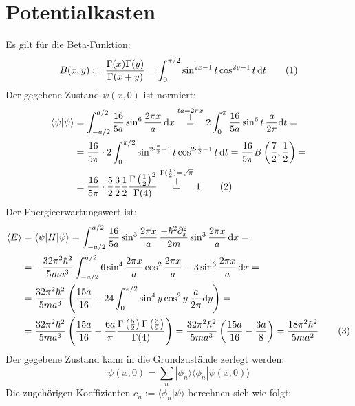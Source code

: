 \documentclass[a4paper,12pt]{article}
\newcommand\numberthis{\addtocounter{equation}{1}\tag{\theequation}}
\newcommand{\bra}{}
\newcommand{\kom}{}
\newcommand{\brak}{}
\newcommand{\braket}{}
\newcommand{\intx}{}
\newcommand{\kla}{}
\newcommand{\oper}{}
\begin{document}
\section{Potentialkasten}
Es gilt für die Beta-Funktion:
\begin{align*}
B(x,y):=\frac{\Gamma(x)\Gamma(y)}{\Gamma(x+y)}=\intx\int_{0}^{\pi/2}\sin^{2x-1}t\cos^{2y-1}t\,\mathrm{d}t \numberthis\label{Beta Funktion}
\end{align*}
Der gegebene Zustand $\psi(x,0)$ ist normiert:
\begin{align*}
\brak\langle {\psi}| {\psi}\rangle&=\intx\int_{-a/2}^{a/2}\frac{16}{5a}\sin^6\frac{2\pi x}{a}\,\mathrm{d}x\kom\overset{\substack{{ta=2\pi x} \\ |}}{=}2\intx\int_{0}^{\pi}\frac{16}{5a}\sin^6t\,\frac{a}{2\pi}\mathrm{d}t= \\
&=\frac{16}{5\pi}\cdot 2\intx\int_{0}^{\pi/2}\sin^{2\cdot\frac{7}{2}-1}t\cos^{2\cdot\frac{1}{2}-1}t\,\mathrm{d}t=\frac{16}{5\pi}B\left(\frac{7}{2},\frac{1}{2}\right)= \\
&=\frac{16}{5\pi}\cdot\frac{5}{2}\frac{3}{2}\frac{1}{2}\frac{\Gamma\kla\left( {\frac{1}{2}} \right)^2}{\Gamma(4)}\kom\overset{\substack{{\Gamma(\frac{1}{2})=\sqrt{\pi}} \\ |}}{=}1 \numberthis\label{Normierung}
\end{align*}
Der Energieerwartungswert ist:
\begin{align*}
\bra\langle {E}\rangle&=\braket\langle {\psi} | {H} | {\psi}\rangle=\intx\int_{-a/2}^{a/2}\frac{16}{5a}\sin^3\frac{2\pi x}{a}\,\frac{-\hbar^2\partial_x^2}{2m}\sin^3\frac{2\pi x}{a}\,\mathrm{d}x= \\
&=-\frac{32\pi^2\hbar^2}{5ma^3}\intx\int_{-a/2}^{a/2}6\sin^4\frac{2\pi x}{a}\cos^2\frac{2\pi x}{a} - 3\sin^6\frac{2\pi x}{a}\,\mathrm{d}x= \\
&=\frac{32\pi^2\hbar^2}{5ma^3}\kla\left( {\frac{15a}{16}-24\intx\int_{0}^{\pi/2}\sin^4y\cos^2y\,\frac{a}{2\pi}\mathrm{d}y} \right)=\\
&=\frac{32\pi^2\hbar^2}{5ma^3}\kla\left( {\frac{15a}{16}-\frac{6a}{\pi}\frac{\Gamma\kla\left( {\frac{5}{2}} \right)\Gamma\left(\frac{3}{2}\right)}{\Gamma(4)}} \right)=\frac{32\pi^2\hbar^2}{5ma^3}\kla\left( {\frac{15a}{16}-\frac{3a}{8}} \right)=\frac{18\pi^2\hbar^2}{5ma^2}\numberthis\label{Energieerwartung}
\end{align*}
Der gegebene Zustand kann in die Grundzustände zerlegt werden:
$$\psi (x,0)=\sum_n \oper |\phi_n\rangle\langle \phi_n|\psi(x,0)\rangle$$
Die zugehörigen Koeffizienten $c_n:=\brak\langle {\phi_n}| {\psi}\rangle$ berechnen sich wie folgt:
\end{document}

